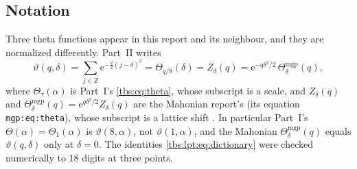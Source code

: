 \documentclass[11pt,a4paper]{article}
\numberwithin{equation}{section}
\theoremstyle{definition}
\newcommand{\Z}{\mathbb Z}
\newcommand{\ee}{\mathrm e}
\newcommand{\code}[1]{\texttt{#1}}
\begin{document}
\subsection{Notation}\label{tbs:lpt:sec:notation}
Three theta functions appear in this report and its neighbour, and they
are normalized differently. Part~II writes
\begin{equation}\label{tbs:lpt:eq:dictionary}
 \vartheta(q,\delta)=\sum_{j\in\Z}\ee^{-\frac q2(j-\delta)^2}
 =\Theta_{q/8}(\delta)
 =Z_\delta(q)
 =\ee^{-q\delta^2/2}\,\Theta^{\mathrm{mgp}}_\delta(q),
\end{equation}
where $\Theta_\tau(\alpha)$ is Part~I's \eqref{tbs:eq:theta}, whose
subscript is a scale, and $Z_\delta(q)$ and
$\Theta^{\mathrm{mgp}}_\delta(q)=\ee^{q\delta^2/2}Z_\delta(q)$ are the
Mahonian report's (its equation \code{mgp:eq:theta}), whose subscript is a
lattice shift \cite{lptMahonian}. In particular Part~I's $\Theta(\alpha)=\Theta_1(\alpha)$ is
$\vartheta(8,\alpha)$, not $\vartheta(1,\alpha)$, and the Mahonian
$\Theta^{\mathrm{mgp}}_\delta(q)$ equals $\vartheta(q,\delta)$ only at
$\delta=0$. The identities \eqref{tbs:lpt:eq:dictionary} were checked
numerically to 18 digits at three points.
\end{document}
